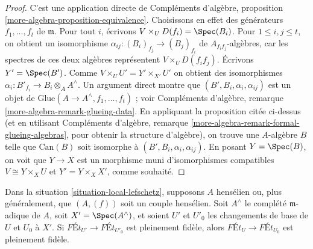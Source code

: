 \begin{proof}
C'est une application directe de
Compléments d'algèbre, proposition \ref{more-algebra-proposition-equivalence}.
Choisissons en effet des générateurs $f_1, \ldots, f_t$ de $\mathfrak m$.
Pour tout $i$, écrivons $V \times_U D(f_i) = \Spec(B_i)$.
Pour $1 \leq i, j \leq t$, on obtient un isomorphisme
$\alpha_{ij} : (B_i)_{f_j} \to (B_j)_{f_i}$ de $A_{f_if_j}$-algèbres,
car les spectres de ces deux algèbres représentent $V \times_U D(f_if_j)$.
Écrivons $Y' = \Spec(B')$. Comme $V \times_U U' = Y' \times_{X'} U'$
on obtient des isomorphismes $\alpha_i : B'_{f_i} \to B_i \otimes_A A^\wedge$.
Un argument direct montre que $(B', B_i, \alpha_i, \alpha_{ij})$
est un objet de $\text{Glue}(A \to A^\wedge, f_1, \ldots, f_t)$ ; voir
Compléments d'algèbre, remarque \ref{more-algebra-remark-glueing-data}.
En appliquant la proposition citée ci-dessus (et en utilisant
Compléments d'algèbre, remarque \ref{more-algebra-remark-formal-glueing-algebras},
pour obtenir la structure d'algèbre), on trouve une $A$-algèbre $B$ telle que
$\text{Can}(B)$ soit isomorphe à $(B', B_i, \alpha_i, \alpha_{ij})$.
En posant $Y = \Spec(B)$, on voit que $Y \to X$ est un morphisme
muni d'isomorphismes compatibles
$V \cong Y \times_X U$ et $Y' = Y \times_X X'$, comme souhaité.
\end{proof}

\begin{lemma}
\label{lemma-fully-faithful-henselian-completion}
Dans la situation \ref{situation-local-lefschetz}, supposons $A$ hensélien
ou, plus généralement, que $(A, (f))$ soit un couple hensélien.
Soit $A^\wedge$ le complété $\mathfrak m$-adique de $A$,
soit $X' = \Spec(A^\wedge)$, et soient $U'$ et $U'_0$ les changements de base de
$U$ et $U_0$ à $X'$. Si $\textit{F\'Et}_{U'} \to \textit{F\'Et}_{U'_0}$
est pleinement fidèle, alors $\textit{F\'Et}_U \to \textit{F\'Et}_{U_0}$
est pleinement fidèle.
\end{lemma}

